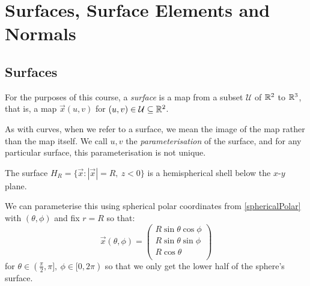 \documentclass[../main.tex]{subfiles}
\begin{document}
\section{Surfaces, Surface Elements and Normals}
\subsection{Surfaces}
\begin{definition}[Surface]
  For the purposes of this course, a \textit{surface} is a map from a subset $\mathcal{U}$ of $\mathbb{R}^2$ to $\mathbb{R}^3$, that is, a map $\vec{x}(u, v)$ for $(u, v) \in \mathcal{U} \subseteq \mathbb{R}^2$.
\end{definition}
As with curves, when we refer to a surface, we mean the image of the map rather than the map itself.
We call $u, v$ the \textit{parameterisation} of the surface, and for any particular surface, this parameterisation is not unique.
\begin{example}
  \label{hemisphericalParameterisation}
  The surface $H_R = \{\vec{x}: |\vec{x}| = R,\ z < 0\}$ is a hemispherical shell below the $x$-$y$ plane.

  We can parameterise this using spherical polar coordinates from \cref{sphericalPolar} with $(\theta, \phi)$ and fix $r = R$ so that:
  \[
    \vec{x}(\theta, \phi) = \begin{pmatrix}
    R\sin\theta\cos\phi \\
    R\sin\theta\sin\phi \\
    R\cos\theta \\
    \end{pmatrix}
  \]
  for $\theta \in (\frac{\pi}{2}, \pi],\ \phi \in [0, 2\pi)$ so that we only get the lower half of the sphere's surface.
\end{example}
\end{document}
